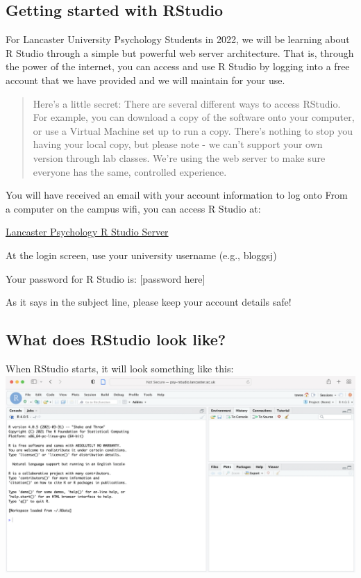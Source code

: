 \documentclass[
]{book}
\begin{document}
\hypertarget{getting_started}{%
\subsection{Getting started with RStudio}\label{getting_started}}

For Lancaster University Psychology Students in 2022, we will be learning about R Studio through a simple but powerful web server architecture. That is, through the power of the internet, you can access and use R Studio by logging into a free account that we have provided and we will maintain for your use.

\begin{quote}
Here's a little secret: There are several different ways to access RStudio. For example, you can download a copy of the software onto your computer, or use a Virtual Machine set up to run a copy. There's nothing to stop you having your local copy, but please note - we can't support your own version through lab classes. We're using the web server to make sure everyone has the same, controlled experience.
\end{quote}

You will have received an email with your account information to log onto From a computer on the campus wifi, you can access R Studio at:

\href{http://psy-rstudio.lancaster.ac.uk}{Lancaster Psychology R Studio Server}

At the login screen, use your university username (e.g., bloggsj)

Your password for R Studio is: {[}password here{]}

As it says in the subject line, please keep your account details safe!

\hypertarget{what-does-rstudio-look-like}{%
\subsection{What does RStudio look like?}\label{what-does-rstudio-look-like}}

When RStudio starts, it will look something like this: \includegraphics{files/Week_1/RStudio_starup_screen.png}
\end{document}
